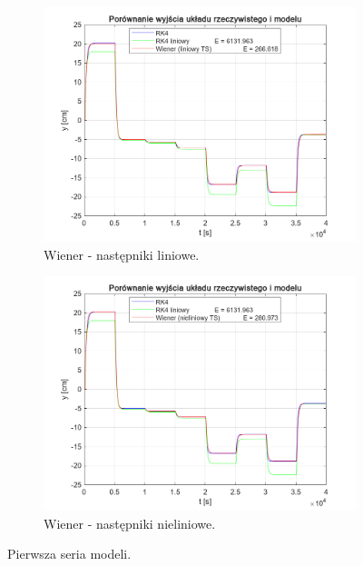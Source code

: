 \begin{figure}[b!]
\begin{subfigure}[b]{0.49\paperwidth}
\centering
\includegraphics[width=\linewidth]{pictures/WienerLinearModel_1}
\caption{Wiener - następniki liniowe.}
\end{subfigure}
\hfill
\begin{subfigure}[b]{0.49\paperwidth}
\centering
\includegraphics[width=\linewidth]{pictures/WienerNonlinearModel_1}
\caption{Wiener - następniki nieliniowe.}
\end{subfigure}

\caption{Pierwsza seria modeli.}
\end{figure}

\newpage

